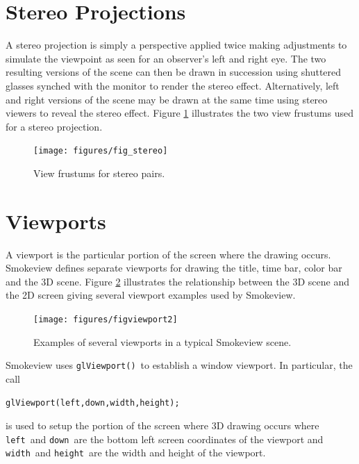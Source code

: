 \documentclass[11pt,twoside]{book}
\newcommand{\figoptions}{htp}
\begin{document}
\section{Stereo Projections}

A stereo projection is simply a perspective applied twice making adjustments to simulate the viewpoint as seen for an observer's left and right eye.  The two resulting versions of the
scene can then be drawn in succession using shuttered glasses synched with the monitor to render the stereo effect.  Alternatively, left and right versions of the scene may be drawn at the same time using stereo viewers to reveal the stereo effect.  Figure \ref{figstereo} illustrates the two view frustums used for a stereo projection.

\begin{figure}[\figoptions]
\begin{center}
\texttt{[image: figures/fig\_stereo]}
\end{center}
\caption{View frustums for stereo pairs.}
 \label{figstereo}
\end{figure}

\section{Viewports}
A viewport is the particular portion of the screen where the drawing
occurs.  Smokeview defines separate viewports for drawing the
title, time bar, color bar and the 3D scene.  Figure
\ref{figviewports} illustrates the relationship between the 3D
scene and the 2D screen giving several viewport examples used by
Smokeview.
\begin{figure}[\figoptions]
\begin{center}
\texttt{[image: figures/figviewport2]}
\end{center}
\caption{Examples of several viewports in a typical Smokeview scene.}
 \label{figviewports}
\end{figure}

Smokeview uses {\tt glViewport()}\ to establish a window viewport.  In particular, the call
\begin{verbatim}
glViewport(left,down,width,height);
\end{verbatim}
is used to setup the portion of the screen where 3D drawing occurs where {\tt left}\
and {\tt down}\ are the bottom left screen coordinates of the viewport and {\tt width}\
and {\tt height}\ are the width and height of the viewport.

%
%
\end{document}
